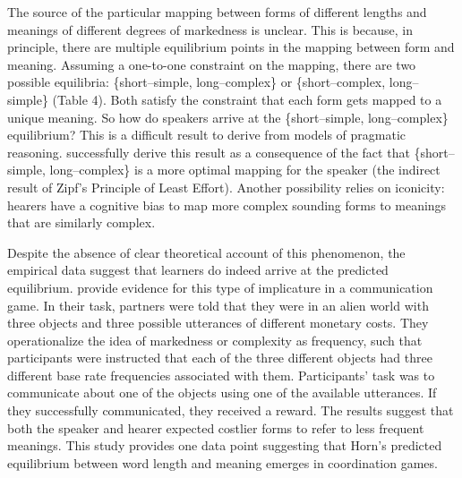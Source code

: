 \documentclass[man]{apa2}
\begin{document}
The source of the particular mapping between forms of different lengths and meanings of different degrees of markedness is unclear. This is because, in principle, there are multiple equilibrium points in the mapping between form and meaning. Assuming a one-to-one constraint on the mapping, there are two possible equilibria: \{short--simple, long--complex\} or \{short--complex, long--simple\} (Table 4). Both satisfy the constraint that each  form gets mapped to a unique meaning. So how do speakers arrive at the  \{short--simple, long--complex\} equilibrium? This is a difficult result to derive from models of pragmatic reasoning.  successfully derive this result as a consequence of the fact that \{short--simple, long--complex\} is a more optimal mapping for the speaker (the indirect result of Zipf's Principle of Least Effort). Another possibility relies on iconicity: hearers have a cognitive bias to map more complex sounding forms to meanings that are similarly complex. 

Despite the absence of clear theoretical account of this phenomenon, the empirical data suggest that learners do indeed arrive at the predicted equilibrium.  provide evidence for this type of implicature in a communication game.  In their task, partners were told that they were in an alien world with three objects and three possible utterances of different monetary costs. They operationalize the idea of markedness or complexity as frequency, such that participants were instructed that each of the three different objects had three different base rate frequencies  associated with them.  Participants' task was to communicate about one of the objects using one of the available utterances. If they successfully communicated, they received a reward. The results suggest that both the speaker and hearer expected costlier forms to refer to less frequent meanings. This study provides one data point suggesting that Horn's predicted equilibrium between word length and meaning emerges in coordination games.  
\end{document}
